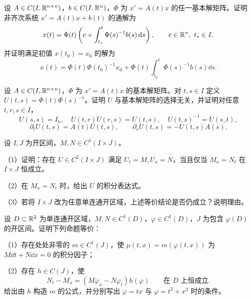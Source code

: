 \noindent\begin{minipage}{\linewidth}
设 $A\in C(I,\mathbb R^{n\times n})$，$b\in C(I,\mathbb R^n)$，$\Phi$ 为 $x'=A(t)x$ 的任一基本解矩阵。证明非齐次系统 $x'=A(t)x+b(t)$ 的通解为
\[x(t)=\Phi(t)\left(c+\int_{t_*}^t\Phi(s)^{-1}b(s)\,\mathrm d s\right),\qquad c\in\mathbb R^n,\ t_*\in I.\]
并证明满足初值 $x(t_0)=x_0$ 的解为
\[x(t)=\Phi(t)\Phi(t_0)^{-1}x_0+\Phi(t)\int_{t_0}^t\Phi(s)^{-1}b(s)\dd s.\]
\end{minipage}\par\vspace{5pt}
\noindent\begin{minipage}{\linewidth}
设 $A\in C(I,\mathbb R^{n\times n})$，$\Phi$ 为 $x'=A(t)x$ 的基本解矩阵。对 $t,s\in I$ 定义 $U(t,s)=\Phi(t)\Phi(s)^{-1}$。证明 $U$ 与基本解矩阵的选择无关，并证明对任意 $t,r,s\in I$，
\[U(s,s)=I_n,\quad U(t,r)U(r,s)=U(t,s),\quad U(t,s)^{-1}=U(s,t),\]
\[\partial_tU(t,s)=A(t)U(t,s),\qquad \partial_sU(t,s)=-U(t,s)A(s).\]
\end{minipage}\par\vspace{5pt}
\noindent\begin{minipage}{\linewidth}
设 $I,J$ 为开区间，$M,N\in C^1(I\times J)$。
\par（1）证明：存在 $U\in C^2(I\times J)$ 满足 $U_t=M,U_x=N$，当且仅当 $M_x=N_t$ 在 $I\times J$ 恒成立。
\par（2）在 $M_x=N_t$ 时，给出 $U$ 的积分表达式。
\par（3）若将 $I\times J$ 改为任意单连通开区域，上述等价结论是否仍成立？说明理由。
\end{minipage}\par\vspace{5pt}
\noindent\begin{minipage}{\linewidth}
设 $D\subset\mathbb R^2$ 为单连通开区域，$M,N\in C^1(D)$，$\varphi\in C^1(D)$，$J$ 为包含 $\varphi(D)$ 的开区间。证明下列命题等价：
\par（1）存在处处非零的 $m\in C^1(J)$，使 $\mu(t,x)=m(\varphi(t,x))$ 为 $M\dd t+N\dd x=0$ 的积分因子；
\par（2）存在 $h\in C(J)$，使
\[N_t-M_x=(M\varphi_x-N\varphi_t)h(\varphi)\qquad\text{在 }D\text{ 上恒成立}.\]
给出由 $h$ 构造 $m$ 的公式，并分别写出 $\varphi=tx$ 与 $\varphi=t^2+x^2$ 时的条件。
\end{minipage}\par\vspace{5pt}

